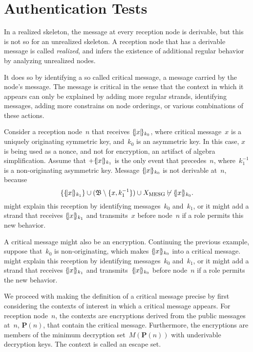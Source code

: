\documentclass[12pt]{article}
\theoremstyle{definition}
\newcommand{\scap}[1]{\ensuremath{\mathop{\relax
                    \smash{\mbox{\sc#1}}}\!\mathop{\vphantom{#1}}\nolimits}}
\newcommand{\base}{\ensuremath{\mathfrak B}}
\newcommand{\pubmsg}{\mathbf{P}}
\begin{document}
\section{Authentication Tests}\label{sec:auth tests}

In a realized skeleton, the message at every reception node is
derivable, but this is not so for an unrealized skeleton.  A reception
node that has a derivable message is called \emph{realized}, and
{\cpsa} infers the existence of additional regular behavior by
analyzing unrealized nodes.

It does so by identifying a so called critical message, a message
carried by the node's message.  The message is critical in the sense
that the context in which it appears can only be explained by adding
more regular strands, identifying messages, adding more constrains on
node orderings, or various combinations of these actions.

Consider a reception node~$n$ that receives $\{\!|x|\!\}_{k_0}$, where
critical message~$x$ is a uniquely originating symmetric key,
and~$k_0$ is an asymmetric key.  In this case, $x$ is being used as a
nonce, and not for encryption, an artifact of algebra simplification.
Assume that $\mathord +\{\!|x|\!\}_{k_1}$ is the only event that precedes~$n$,
where~$k^{-1}_1$ is a non-originating asymmetric key.  Message
$\{\!|x|\!\}_{k_0}$ is not derivable at~$n$, because
$$\{\enc{x}{k_1}\}\cup(\base\setminus\{x,k^{-1}_1\})\cup
X_{\scap{mesg}}\not\vdash\enc{x}{k_0}.$$ {\cpsa} might explain this reception
by identifying messages~$k_0$ and~$k_1$, or it might add a strand that
receives $\{\!|x|\!\}_{k_1}$ and transmits~$x$ before node~$n$ if a role
permits this new behavior.

A critical message might also be an encryption.  Continuing the
previous example, suppose that~$k_0$ is non-originating, which makes
$\{\!|x|\!\}_{k_0}$ into a critical message.  {\cpsa} might explain this
reception by identifying messages~$k_0$ and~$k_1$, or it might add a
strand that receives $\{\!|x|\!\}_{k_1}$ and transmits~$\{\!|x|\!\}_{k_0}$
before node~$n$ if a role permits the new behavior.

We proceed with making the definition of a critical message precise by
first considering the contexts of interest in which a critical message
appears.  For reception node~$n$, the contexts are encryptions derived
from the public messages at~$n$, $\pubmsg(n)$, that contain the
critical message.  Furthermore, the encryptions are members of the
minimum decryption set~$M(\pubmsg(n))$ with underivable decryption
keys.  The context is called an escape set.
\end{document}
